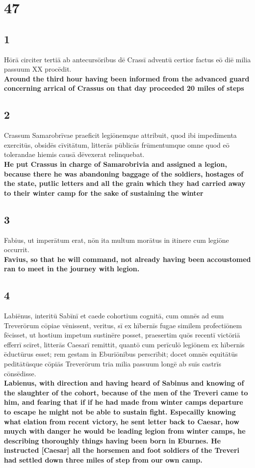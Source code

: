 \documentclass{article}
\begin{document}
\section*{47}


\subsection*{1}
Hōrā circiter tertiā ab antecursōribus dē Crassī adventū certior factus eō diē milia passuum XX procēdit. \\
\textbf{Around the third hour having been informed from the advanced guard concerning arrical of Crassus on that day proceeded 20 miles of steps}

\subsection*{2}
Crassum Samarobrīvae praeficit legiōnemque attribuit, quod ibi impedīmenta exercitūs, obsidēs cīvitātum, litterās pūblicās frūmentumque omne quod eō tolerandae hiemis causā dēvexerat relinquebat. \\
\textbf{He put Crassus in charge of Samarobrivia and assigned a legion, because there he was abandoning baggage of the soldiers, hostages of the state, putlic letters and all the grain which they had carried away to their winter camp for the sake of sustaining the winter}

\subsection*{3}
Fabius, ut imperātum erat, nōn ita multum morātus in itinere cum legiōne occurrit. \\
\textbf{Favius, so that he will command, not already having been accoustomed ran to meet in the journey with legion. }

\subsection*{4}
Labiēnus, interitū Sabīnī et caede cohortium cognitā, cum omnēs ad eum Treverōrum cōpiae vēnissent, veritus, sī ex hībernīs fugae similem profectiōnem fēcisset, ut hostium impetum sustinēre posset, praesertim quōs recentī victōriā efferrī scīret, litterās Caesarī remittit, quantō cum perīculō legiōnem ex hībernīs ēductūrus esset; rem gestam in Eburiōnibus perscrībit; docet omnēs equitātūs peditātūsque cōpiās Treverōrum tria milia passuum longē ab suīs castrīs cōnsēdisse.\\
\textbf{Labienus, with direction and having heard of Sabinus and knowing of the slaughter of the cohort, because of the men of the Treveri came to him, and fearing that if if he had made from winter camps departure to escape he might not be able to sustain fight. Especailly knowing what elation from recent victory, he sent letter back to Caesar, how muych with danger he would be leading legion from winter camps, he describing thoroughly things having been born in Eburnes. He instructed [Caesar] all the horsemen and foot soldiers of the Treveri had settled down three miles of step from our own camp.}
\end{document}
